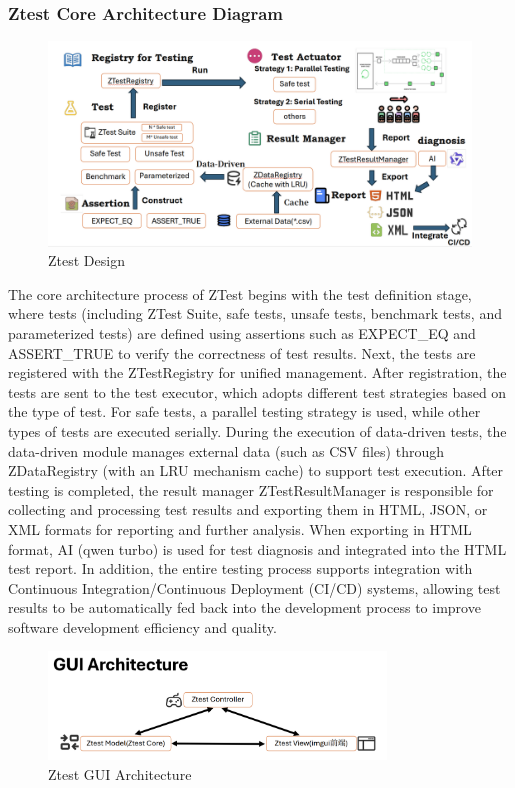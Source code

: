 \documentclass{article}
\begin{document}
\subsubsection{Ztest Core Architecture Diagram}
\begin{figure}[H]
    \centering
    \includegraphics[width=\textwidth]{img/core.png} %
    \caption{Ztest Design}
    \label{fig:ztest design }
\end{figure}
The core architecture process of ZTest begins with the test definition stage, where tests (including ZTest Suite, safe tests, unsafe tests, benchmark tests, and parameterized tests) are defined using assertions such as EXPECT\_EQ and ASSERT\_TRUE to verify the correctness of test results.
Next, the tests are registered with the ZTestRegistry for unified management.
After registration, the tests are sent to the test executor, which adopts different test strategies based on the type of test. For safe tests, a parallel testing strategy is used, while other types of tests are executed serially.
During the execution of data-driven tests, the data-driven module manages external data (such as CSV files) through ZDataRegistry (with an LRU mechanism cache) to support test execution.
After testing is completed, the result manager ZTestResultManager is responsible for collecting and processing test results and exporting them in HTML, JSON, or XML formats for reporting and further analysis.
When exporting in HTML format, AI (qwen turbo) is used for test diagnosis and integrated into the HTML test report.
In addition, the entire testing process supports integration with Continuous Integration/Continuous Deployment (CI/CD) systems, allowing test results to be automatically fed back into the development process to improve software development efficiency and quality.
\begin{figure}[H]
    \centering
    \includegraphics[width=0.8\textwidth]{img/guiarch.png} %
    \caption{Ztest GUI Architecture}
    \label{fig:ztest gui architecture }
\end{figure}
\end{document}
